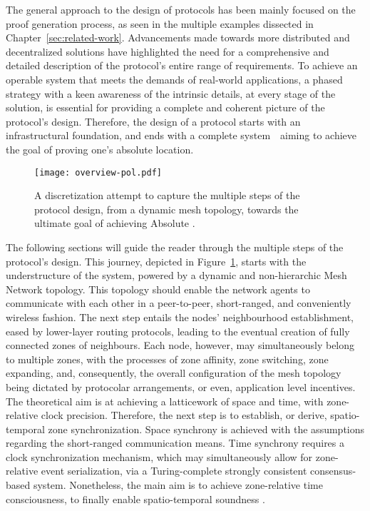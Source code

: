 The general approach to the design of \pol{} protocols has been mainly focused on the proof generation process, as seen in the multiple examples dissected in Chapter~\ref{sec:related-work}. Advancements made towards more distributed and decentralized solutions have highlighted the need for a comprehensive and detailed description of the protocol's entire range of requirements. To achieve an operable system that meets the demands of real-world applications, a phased strategy with a keen awareness of the intrinsic details, at every stage of the solution, is essential for providing a complete and coherent picture of the protocol's design. Therefore, the design of a \pol{} protocol starts with an infrastructural foundation, and ends with a complete system~\textemdash~aiming to achieve the goal of proving one's absolute location.

\begin{figure}[ht]
    \begin{center}
    \texttt{[image: overview-pol.pdf]}
    \caption{A discretization attempt to capture the multiple steps of the protocol design, from a dynamic mesh topology, towards the ultimate goal of achieving Absolute \pol.}
    \label{fig:proof-of-location-overview}
    \end{center}
\end{figure}

The following sections will guide the reader through the multiple steps of the protocol's design. This journey, depicted in Figure~\ref{fig:proof-of-location-overview}, starts with the understructure of the system, powered by a dynamic and non-hierarchic Mesh Network topology. This topology should enable the network agents to communicate with each other in a peer-to-peer, short-ranged, and conveniently wireless fashion. The next step entails the nodes' neighbourhood establishment, eased by lower-layer routing protocols, leading to the eventual creation of fully connected zones of neighbours. Each node, however, may simultaneously belong to multiple zones, with the processes of zone affinity, zone switching, zone expanding, and, consequently, the overall configuration of the mesh topology being dictated by protocolar arrangements, or even, application level incentives. The theoretical aim is at achieving a latticework of space and time, with zone-relative clock precision. Therefore, the next step is to establish, or derive, spatio-temporal zone synchronization. Space synchrony is achieved with the assumptions regarding the short-ranged communication means. Time synchrony requires a clock synchronization mechanism, which may simultaneously allow for zone-relative event serialization, via a Turing-complete strongly consistent consensus-based system. Nonetheless, the main aim is to achieve zone-relative time consciousness, to finally enable spatio-temporal soundness \cite{nasrulin2018robust}.

